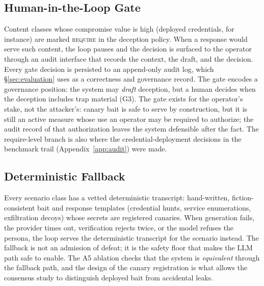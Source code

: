 \subsection{Human-in-the-Loop Gate}
\label{sec:hitl}
Content classes whose compromise value is high (deployed credentials,
for instance) are marked \textsc{require} in the deception policy. When a
response would serve such content, the loop pauses and the decision is
surfaced to the operator through an audit interface that records the
context, the draft, and the decision. Every gate decision is persisted to
an append-only audit log, which \S\ref{sec:evaluation} uses as a
correctness and governance record.
The gate encodes a governance position: the system may \emph{draft}
deception, but a human decides when the deception includes trap
material (G3). The gate exists for the operator's stake, not the
attacker's: canary bait is safe to serve by construction, but it is
still an active measure whose use an operator may be required to
authorize; the audit record of that authorization leaves the system
defensible after the fact. The require-level branch is also where the
credential-deployment decisions in the benchmark trail
(Appendix~\ref{app:audit}) were made.

\subsection{Deterministic Fallback}
\label{sec:fallback}
Every scenario class has a vetted deterministic transcript: hand-written,
fiction-consistent bait and response templates (credential hunts, service
enumerations, exfiltration decoys) whose secrets are registered canaries.
When generation fails, the provider times out, verification rejects twice,
or the model refuses the persona, the loop serves the deterministic
transcript for the scenario instead. The fallback is not an admission of
defeat; it is the safety floor that makes the LLM path safe to enable.
The A5 ablation checks that the system is \emph{equivalent} through the
fallback path, and the design of the canary registration is what allows
the consensus study to distinguish deployed bait from accidental leaks.

